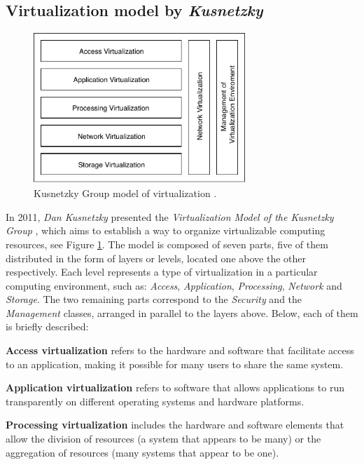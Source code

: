 	\subsection{Virtualization model by \textit{Kusnetzky}}
	
	\begin{figure}[H]
		\centering
		\includegraphics[width=8cm]{images/Kusnetzky2011.pdf}
		\vspace{-0.2cm}
		\caption{Kusnetzky Group model of virtualization \cite{Kusnetzky2011}.}
		\label{fig:kusnetzkyGroupModelOfVirtualization}
	\end{figure}
	
	In 2011, \textit{Dan Kusnetzky} presented the \textit{Virtualization Model of the Kusnetzky Group} \cite{Kusnetzky2011}, which aims to establish a way to organize  virtualizable computing resources, see Figure \ref{fig:kusnetzkyGroupModelOfVirtualization}. The model is composed of seven parts, five of them distributed in the form of layers or levels, located one above the other respectively. Each level represents a type of virtualization in a particular computing environment, such as: \textit{Access}, \textit{Application}, \textit{Processing}, \textit{Network} and \textit{Storage}. The two remaining parts correspond to the \textit{Security} and the \textit{Management} classes, arranged in parallel to the layers above. Below, each of them is briefly described:

	\textbf{Access virtualization} refers to the hardware and software that facilitate access to an application, making it possible for many users to share the same system.
		
	\textbf{Application virtualization} refers to software that allows applications to run transparently on different operating systems and hardware platforms.
		
	\textbf{Processing virtualization} includes the hardware and software elements that allow the division of resources (a system that appears to be many) or the aggregation of resources (many systems that appear to be one).

